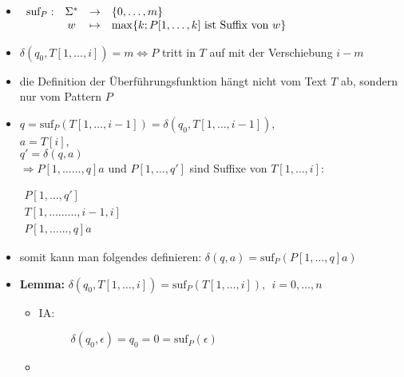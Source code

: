 \topbreak
\up\up
\begin{itemize}[itemsep=-1pt]
	\item $\begin{array}[t]{rccl}
			\text{suf}_{P} : &\Sigma^{*}&\rightarrow & \{0,\dots,m\}\\
			& w & \mapsto & \max\{k; P[1,\dots,k]\text{ ist Suffix von }w\}
		\end{array}$
	\item $\delta(q_0,T[1,\dots,i]) = m \Longleftrightarrow P$ tritt  in $T$ auf mit der Verschiebung $i-m$
	\item die Definition der Überführungsfunktion hängt nicht vom Text $T$ ab, sondern nur vom Pattern $P$
	\item $q=\text{suf}_P(T[1,\dots,i-1])=\delta(q_0,T[1,\dots,i-1])$,\\
		$a=T[i]$,\\
		$q'=\delta(q,a)$\\
		$\Rightarrow P[1,\dots\dots,q]a$ und $P[1,\dots,q']$ sind Suffixe von $T[1,\dots,i]$:\begin{center}
			$\begin{array}{r}
				P[1,\dots,q']\\
				T[1,\dots\dots\dots,i-1,i]\\
				P[1,\dots\dots,q]a
			\end{array}$\end{center}
	\item somit kann man folgendes definieren: $\delta(q,a)=\text{suf}_P(P[1,\dots,q]a)$
	\item \textbf{Lemma:} $\delta(q_0,T[1,\dots,i])=\text{suf}_P(T[1,\dots,i]),~~i=0,\dots,n$
		\up\Proof\vspace*{-0.5\baselineskip}
			\begin{itemize}[itemsep=0pt]
				\item[] \begin{description}
						\item[IA:] $\delta(q_0,\epsilon) = q_0 = 0 = \text{suf}_P(\epsilon)$
					\end{description}
				\item[] 
\end{itemize}
\end{itemize}

